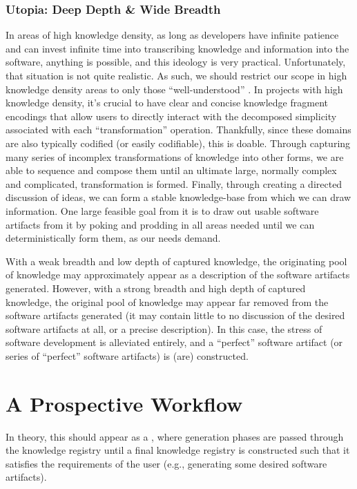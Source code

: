 \subsubsection{Utopia: Deep Depth \& Wide Breadth}
\label{chap:ideology:sec:thoughts_of_generation:subsec:feasibility:subsubsec:utopia}

In areas of high knowledge density, as long as developers have infinite patience
and can invest infinite time into transcribing knowledge and information into
the software, anything is possible, and this ideology is very practical.
Unfortunately, that situation is not quite realistic. As such, we should
restrict our scope in high knowledge density areas to only those
``well-understood'' \cite{well-understood}. In projects with high knowledge
density, it's crucial to have clear and concise knowledge fragment encodings
that allow users to directly interact with the decomposed simplicity associated
with each ``transformation'' operation. Thankfully, since these domains are also
typically codified (or easily codifiable), this is doable. Through capturing
many series of incomplex transformations of knowledge into other forms, we are
able to sequence and compose them until an ultimate large, normally complex and
complicated, transformation is formed. Finally, through creating a directed
discussion of ideas, we can form a stable knowledge-base from which we can draw
information. One large feasible goal from it is to draw out usable software
artifacts from it by poking and prodding in all areas needed until we can
deterministically form them, as our needs demand.

With a weak breadth and low depth of captured knowledge, the originating pool of
knowledge may approximately appear as a description of the software artifacts
generated. However, with a strong breadth and high depth of captured knowledge,
the original pool of knowledge may appear far removed from the software
artifacts generated (it may contain little to no discussion of the desired
software artifacts at all, or a precise description). In this case, the stress
of software development is alleviated entirely, and a ``perfect'' software
artifact (or series of ``perfect'' software artifacts) is (are) constructed.

\section{A Prospective Workflow}
\label{chap:ideology:sec:a_prospective_workflow}

In theory, this should appear as a , where generation phases are passed
through the knowledge registry until a final knowledge registry is constructed
such that it satisfies the requirements of the user (e.g., generating some
desired software artifacts).

